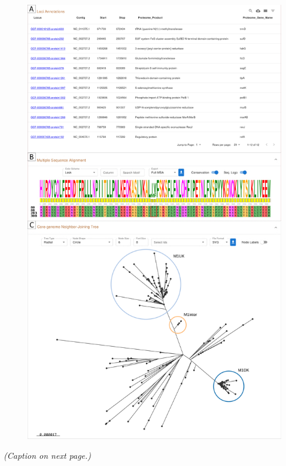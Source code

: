 \begin{figure}[h!]
    \centering
    \includegraphics[angle=0,height=0.92\textheight]{figures/chapter 2/Figure4.pdf}
    \label{fig:chap2_figure4}
\end{figure}
\vspace*{-6mm}
\begin{center}
    \emph{(Caption on next page.)}
\end{center}
